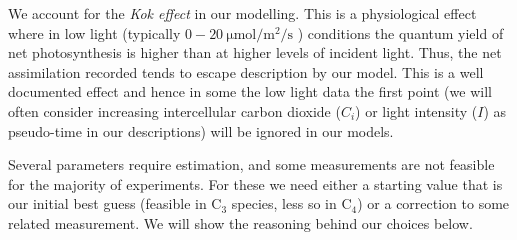 \documentclass[11pt]{article} %
\begin{document}
We account for the \emph{Kok effect} in our modelling. This is a physiological effect where in low light (typically $0-20\SI{}{\micro \mol \per \m \squared \per \s}$ \cite{TcherkezTrackingoriginsKok2017}) conditions the quantum yield of net photosynthesis is higher than at higher levels of incident light. Thus, the net assimilation recorded tends to escape description by our model. This is a well documented effect \cite{TcherkezTrackingoriginsKok2017}\cite{SharpKokEffectQuantum1984}\cite{HeskelBringingKokeffect2013} and hence in some the low light data the first point (we will often consider increasing intercellular carbon dioxide ($C_i$) or light intensity ($I$) as pseudo-time in our descriptions) will be ignored in our models.

Several parameters require estimation, and some measurements are not feasible for the majority of experiments. For these we need either a starting value that is our initial best guess (feasible in C$_3$ species, less so in C$_4$) or a correction to some related measurement. We will  show the reasoning behind our choices below.
\end{document}
